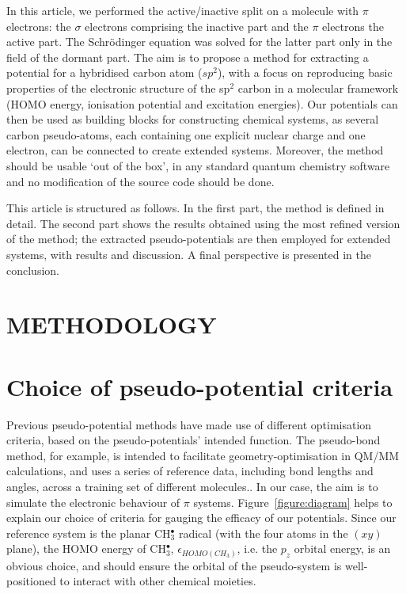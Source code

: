 \documentclass[12pt]{article}
\begin{document}
In this article, we performed the active/inactive split on a molecule with $\pi$ electrons: the $\sigma$ electrons comprising the inactive part and the $\pi$ electrons the active part.
The Schr\"odinger equation was solved for the latter part only in the field of the dormant part.
The aim is to propose a method for extracting a potential for a hybridised carbon atom 
($sp^2$), with a focus on reproducing basic properties of the electronic structure of the sp$^2$ carbon in a molecular framework 
(HOMO energy, ionisation potential and excitation energies).
Our potentials can then be used as 
building blocks for constructing chemical systems, as several carbon pseudo-atoms,
each containing one explicit nuclear charge and one electron, can be connected to create extended
systems.
Moreover, the method should be usable `out of the box', in any standard quantum chemistry software
and no modification of the source code should be done.

This article is structured as follows.
In the first part, the method is defined in detail.
The second part shows the results obtained using the most refined version of the method; the extracted pseudo-potentials are then employed for extended systems, with results and discussion. A final perspective is presented in the conclusion.

\section*{\sffamily \Large METHODOLOGY}

\section*{\sffamily \large Choice of pseudo-potential criteria \label{section:pseudocrit}} 

Previous pseudo-potential methods have made use of different optimisation criteria, based on the pseudo-potentials' intended function. 
The pseudo-bond method, for example, is intended to facilitate geometry-optimisation in QM/MM calculations, and uses a series of reference data, 
including bond lengths and angles, across a training set of different molecules.\cite{zhang_pseudobond_1998}.
In our case, the aim is to simulate the electronic behaviour of $\pi$ systems.
Figure~\ref{figure:diagram} helps to explain our choice of criteria for gauging the efficacy of our potentials. Since our reference system is the planar CH$_3^\bullet$ radical (with the four atoms in the $(xy)$ plane), the HOMO energy of CH$_3^{\bullet}$, $\epsilon_{HOMO(CH_3)}$, i.e. the $p_{z}$ orbital energy, is an obvious choice, and should ensure the orbital of the pseudo-system is well-positioned to interact with other chemical moieties.
\end{document}
